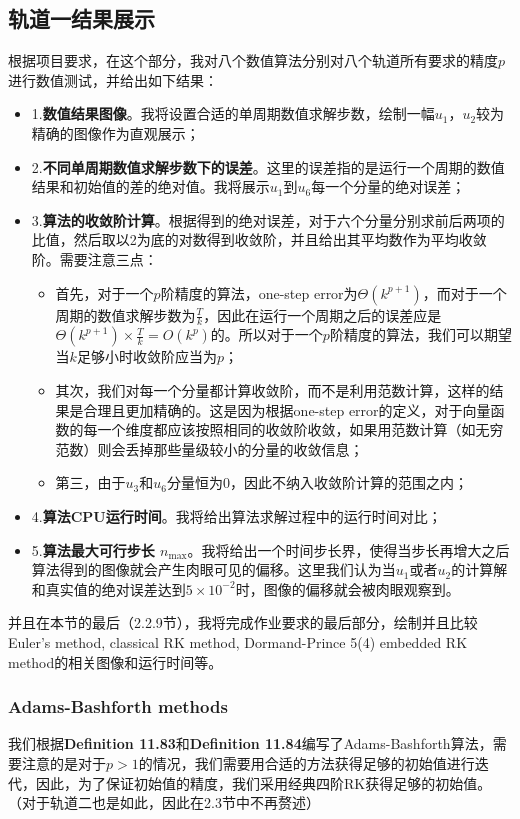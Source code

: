 \documentclass{ctexart}
\begin{document}
\begin{sloppypar}
\subsection{轨道一结果展示}
根据项目要求，在这个部分，我对八个数值算法分别对八个轨道所有要求的精度$p$进行数值测试，并给出如下结果：
\begin{itemize}
    \item 1.\textbf{数值结果图像}。我将设置合适的单周期数值求解步数，绘制一幅$u_1$，$u_2$较为精确的图像作为直观展示；
    \item 2.\textbf{不同单周期数值求解步数下的误差}。这里的误差指的是运行一个周期的数值结果和初始值的差的绝对值。我将展示$u_1$到$u_6$每一个分量的绝对误差；
    \item 3.\textbf{算法的收敛阶计算}。根据得到的绝对误差，对于六个分量分别求前后两项的比值，然后取以2为底的对数得到收敛阶，并且给出其平均数作为平均收敛阶。需要注意三点：
\begin{itemize}
    \item 首先，对于一个$p$阶精度的算法，one-step error为$\Theta(k^{p+1})$，而对于一个周期的数值求解步数为$\frac{T}{k}$，因此在运行一个周期之后的误差应是$\Theta(k^{p+1}) \times \frac{T}{k} = O(k^p)$的。所以对于一个$p$阶精度的算法，我们可以期望当$k$足够小时收敛阶应当为$p$；
    \item 其次，我们对每一个分量都计算收敛阶，而不是利用范数计算，这样的结果是合理且更加精确的。这是因为根据one-step error的定义，对于向量函数的每一个维度都应该按照相同的收敛阶收敛，如果用范数计算（如无穷范数）则会丢掉那些量级较小的分量的收敛信息；
    \item 第三，由于$u_3$和$u_6$分量恒为0，因此不纳入收敛阶计算的范围之内；
\end{itemize}
    \item 4.\textbf{算法CPU运行时间}。我将给出算法求解过程中的运行时间对比；
    \item 5.\textbf{算法最大可行步长 $n_{\max}$}。我将给出一个时间步长界，使得当步长再增大之后算法得到的图像就会产生肉眼可见的偏移。这里我们认为当$u_1$或者$u_2$的计算解和真实值的绝对误差达到$5 \times 10^{-2}$时，图像的偏移就会被肉眼观察到。
\end{itemize}
并且在本节的最后（2.2.9节），我将完成作业要求的最后部分，绘制并且比较Euler's method, classical RK method, Dormand-Prince 5(4) embedded RK method的相关图像和运行时间等。

\subsubsection{Adams-Bashforth methods}
我们根据\textbf{Definition 11.83}和\textbf{Definition 11.84}编写了Adams-Bashforth算法，需要注意的是对于$p > 1$的情况，我们需要用合适的方法获得足够的初始值进行迭代，因此，为了保证初始值的精度，我们采用经典四阶RK获得足够的初始值。（对于轨道二也是如此，因此在2.3节中不再赘述）


\end{sloppypar}
\end{document}
